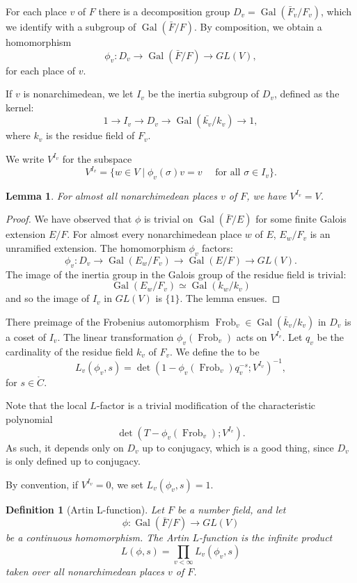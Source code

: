 \documentclass{amsart}
\newtheorem{definition}[equation]{Definition}
\newtheorem{lemma}[equation]{Lemma}
\def\op#1{{\operatorname{#1}}}
\def\CC{\ring{C}}
\def\oG{\op{Gal}}
\begin{document}
For each place $v$ of $F$ there is a decomposition group
$D_v=\oG(\bar F_v/F_v)$, which we identify with a subgroup of
$\oG(\bar F/F)$.  By composition, we obtain a homomorphism
\[
\phi_v:D_v \to \oG(\bar F/F)\to GL(V),
\]
for each place of $v$.   

If $v$ is nonarchimedean, we let $I_v$ be
the inertia subgroup of $D_v$, defined as the kernel:
\[
1 \to I_v \to D_v \to \oG(\bar {k_v}/k_v)\to 1,
\]
where $k_v$ is the residue field of $F_v$.

We write $V^{I_v}$ for the subspace
\[
V^{I_v} = \{w\in V\mid \phi_v(\sigma)v = v \quad\text{ for all } \sigma\in I_v\}.
\]

\begin{lemma}
For almost all nonarchimedean places $v$ of $F$, we have $V^{I_v} = V$.
\end{lemma}

\begin{proof}
We have observed that $\phi$ is trivial on $\oG(\bar{F}/E)$ for some finite
Galois extension $E/F$.  For almost every nonarchimedean place $w$ of $E$,
$E_w/F_v$ is an unramified extension.  The homomorphism $\phi_v$ factors:
\[
\phi_v:D_v\to \oG(E_w/F_v)\to \oG(E/F)\to GL(V).
\]
The image of the inertia group in the Galois group of the residue field is trivial:
\[
\oG(E_w/F_v)\simeq \oG(k_w/k_v)
\]
and so the image of $I_v$ in $GL(V)$ is $\{1\}$.  The lemma ensues.
\end{proof}

There preimage of the Frobenius automorphism $\op{Frob}_v\in\oG(\bar{k}_v/k_v)$ 
in $D_v$ is
a coset of $I_v$.  The linear transformation $\phi_v(\op{Frob}_v)$ acts
on $V^{I_v}$.
Let $q_v$ be the cardinality of the residue field $k_v$ of $F_v$.
We define the  to be
\[
L_v(\phi_v,s) = \op{det}(1- \phi_v(\op{Frob}_v) q_v^{-s}; V^{I_v})^{-1},
\]
for $s\in \CC$.

Note that the local $L$-factor is a trivial modification of the characteristic polynomial
\[
\op{det}(T - \phi_v(\op{Frob}_v); V^{I_v}).
\]
As such, it depends only on  $D_v$ up to conjugacy, which is a good thing, since
$D_v$ is only defined up to conjugacy.

By convention, if $V^{I_v}=0$, we set $L_v(\phi_v,s)=1$.

\begin{definition}[Artin L-function]  Let $F$ be a number field, and let
\[
\phi:\oG(\bar{F}/F)\to GL(V)
\]
be a continuous homomorphism.
The Artin $L$-function is the infinite product
\[
L(\phi,s) = \prod_{v<\infty} L_v(\phi_v,s)
\]
taken over all nonarchimedean places $v$ of $F$.
\end{definition}
\end{document}
